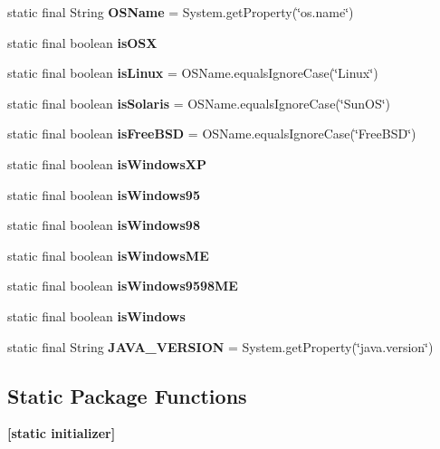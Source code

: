 \begin{DoxyCompactItemize}
\item 
\hypertarget{classj_bittorrent_a_p_i_1_1_constants_ac0f2a445e3540c7470711ecc31bc2607}{
static final String {\bfseries OSName} = System.getProperty(\char`\"{}os.name\char`\"{})}
\label{classj_bittorrent_a_p_i_1_1_constants_ac0f2a445e3540c7470711ecc31bc2607}

\item 
static final boolean {\bfseries isOSX}
\item 
\hypertarget{classj_bittorrent_a_p_i_1_1_constants_a99962b358b0b4a46ede55730a27b7562}{
static final boolean {\bfseries isLinux} = OSName.equalsIgnoreCase(\char`\"{}Linux\char`\"{})}
\label{classj_bittorrent_a_p_i_1_1_constants_a99962b358b0b4a46ede55730a27b7562}

\item 
\hypertarget{classj_bittorrent_a_p_i_1_1_constants_a8060e4011e8c73a0a51e470cdac1e95e}{
static final boolean {\bfseries isSolaris} = OSName.equalsIgnoreCase(\char`\"{}SunOS\char`\"{})}
\label{classj_bittorrent_a_p_i_1_1_constants_a8060e4011e8c73a0a51e470cdac1e95e}

\item 
\hypertarget{classj_bittorrent_a_p_i_1_1_constants_a09a32ed5c7325533c20fba6a25c1bcdd}{
static final boolean {\bfseries isFreeBSD} = OSName.equalsIgnoreCase(\char`\"{}FreeBSD\char`\"{})}
\label{classj_bittorrent_a_p_i_1_1_constants_a09a32ed5c7325533c20fba6a25c1bcdd}

\item 
static final boolean {\bfseries isWindowsXP}
\item 
static final boolean {\bfseries isWindows95}
\item 
static final boolean {\bfseries isWindows98}
\item 
static final boolean {\bfseries isWindowsME}
\item 
static final boolean {\bfseries isWindows9598ME}
\item 
static final boolean {\bfseries isWindows}
\item 
\hypertarget{classj_bittorrent_a_p_i_1_1_constants_a12a6991c5c1e9928d819665c77f3501e}{
static final String {\bfseries JAVA\_\-VERSION} = System.getProperty(\char`\"{}java.version\char`\"{})}
\label{classj_bittorrent_a_p_i_1_1_constants_a12a6991c5c1e9928d819665c77f3501e}

\end{DoxyCompactItemize}
\subsection*{Static Package Functions}
\begin{DoxyCompactItemize}
\item 
\hypertarget{classj_bittorrent_a_p_i_1_1_constants_a4e42efba1c0316ffc4fc06d937fd138a}{
{\bfseries \mbox{[}static initializer\mbox{]}}}
\label{classj_bittorrent_a_p_i_1_1_constants_a4e42efba1c0316ffc4fc06d937fd138a}

\end{DoxyCompactItemize}


